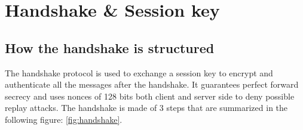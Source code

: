 
\chapter{Handshake \& Session key}
\label{cap:handshake-session-key}

\section{How the handshake is structured}

The handshake protocol is used to exchange a session key to encrypt and authenticate all the messages after the handshake. It guarantees perfect forward secrecy and uses nonces of 128 bits both client and server side to deny possible replay attacks. The handshake is made of 3 steps that are summarized in the following figure: \ref{fig:handshake}.

